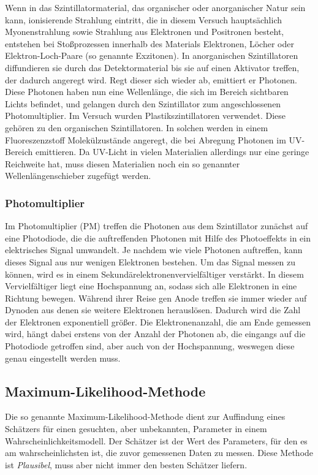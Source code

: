 \documentclass[slug=LM, room=Andreas-Schubert-Bau\,\ K\ 1A, supervisor=Anne-Sophie\ Berthold, coursedate=13.\ 12.\ 2019]{../../Lab_Report_LaTeX/lab_report}
\begin{document}
Wenn in das Szintillatormaterial, das organischer oder anorganischer Natur sein kann, ionisierende
Strahlung eintritt, die in diesem Versuch hauptsächlich Myonenstrahlung sowie Strahlung
aus Elektronen und Positronen besteht, entstehen bei Stoßprozessen innerhalb des Materials Elektronen,
Löcher oder Elektron-Loch-Paare (so genannte Exzitonen).
In anorganischen Szintillatoren diffundieren sie durch das
Detektormaterial bis sie auf einen Aktivator treffen, der dadurch angeregt wird. Regt dieser sich
wieder ab, emittiert er Photonen. Diese Photonen haben nun eine Wellenlänge, die sich im Bereich
sichtbaren Lichts befindet, und gelangen durch den Szintillator zum angeschlossenen
Photomultiplier.
Im Versuch wurden Plastikszintillatoren verwendet. Diese gehören zu den organischen Szintillatoren.
In solchen werden in einem Fluoreszenzstoff Molekülzustände angeregt, die bei Abregung Photonen
im UV-Bereich emittieren. Da UV-Licht in vielen Materialien allerdings nur eine geringe
Reichweite hat, muss diesen Materialien noch ein so genannter Wellenlängenschieber zugefügt werden.

\subsubsection{Photomultiplier}
\label{sec:photomulti}

Im Photomultiplier (PM) treffen die Photonen aus dem Szintillator zunächst auf eine Photodiode,
die die auftreffenden Photonen mit Hilfe des Photoeffekts in ein elektrisches Signal umwandelt.
Je nachdem wie viele Photonen auftreffen, kann dieses Signal aus nur wenigen Elektronen bestehen.
Um das Signal messen zu können, wird es in einem Sekundärelektronenvervielfältiger verstärkt.
In diesem Vervielfältiger liegt eine Hochspannung an, sodass sich alle Elektronen in eine Richtung
bewegen. Während ihrer Reise gen Anode treffen sie immer wieder auf Dynoden aus denen sie
weitere Elektronen herauslösen. Dadurch wird die Zahl der Elektronen exponentiell größer.
Die Elektronenanzahl, die am Ende gemessen wird, hängt dabei erstens von der Anzahl der Photonen
ab, die eingangs auf die Photodiode getroffen sind, aber auch von der Hochspannung, weswegen diese
genau eingestellt werden muss.

\subsection{Maximum-Likelihood-Methode}
\label{sec:likemeth}

Die so genannte Maximum-Likelihood-Methode dient zur Auffindung eines
Sch\"atzers f\"ur einen gesuchten, aber unbekannten, Parameter in
einem Wahrscheinlichkeitsmodell. Der Sch\"atzer ist der Wert des
Parameters, für den
es am wahrscheinlichsten ist, die zuvor gemessenen Daten zu
messen. Diese Methode ist \emph{Plausibel}, muss aber nicht immer den
besten Sch\"atzer liefern\cite{Barlow}.\\
\end{document}

